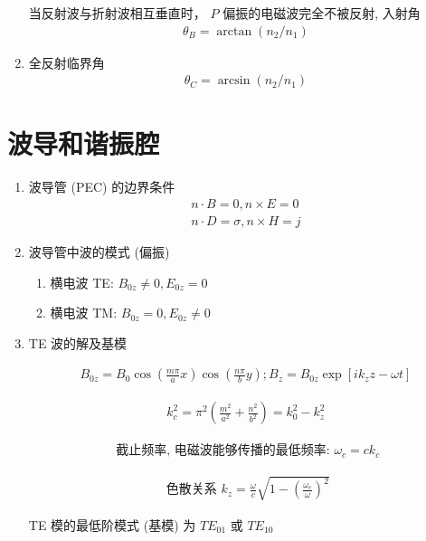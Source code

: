 \documentclass[../../note.tex]{subfiles}
\begin{document}
\begin{enumerate}
	当反射波与折射波相互垂直时， $P$ 偏振的电磁波完全不被反射, 入射角
\begin{align}
	\theta_B=\arctan \left(n_2 / n_1\right)
\end{align}
	\item 全反射临界角
\begin{align}
	\theta_C=\arcsin \left(n_2 / n_1\right)
\end{align}



\end{enumerate}


\section{波导和谐振腔}
\begin{enumerate}
	\item 波导管 (PEC) 的边界条件
	\begin{align}
		n \cdot B=0, n \times E=0 \\
		n \cdot D=\sigma, n \times H=j
	\end{align}
	\item 波导管中波的模式 (偏振)
	\begin{enumerate}
		\item 横电波 TE: $B_{0 z} \neq 0, E_{0 z}=0$
		\item 横电波 TM: $B_{0 z}=0, E_{0 z} \neq 0$
	\end{enumerate}
	
	\item TE 波的解及基模
	
	\begin{align}
	B_{0 z}=B_0 \cos \left(\frac{m \pi}{a} x\right) \cos \left(\frac{n \pi}{b} y\right) ; B_z=B_{0 z} \exp \left[i k_z z-\omega t\right]
		\end{align}
	
	\begin{align}
	k_c^2=\pi^2\left(\frac{m^2}{a^2}+\frac{n^2}{b^2}\right)=k_0^2-k_z^2
		\end{align}
	
	\begin{align}
	\text { 截止频率, 电磁波能够传播的最低频率: } \omega_c=c k_c
		\end{align}
	
	\begin{align}
	\text { 色散关系 } k_z=\frac{\omega}{c} \sqrt{1-\left(\frac{\omega_c}{\omega}\right)^2}
		\end{align}
	
	TE 模的最低阶模式 (基模) 为 $T E_{01}$ 或 $T E_{10}$
	

\end{enumerate}
\end{document}
